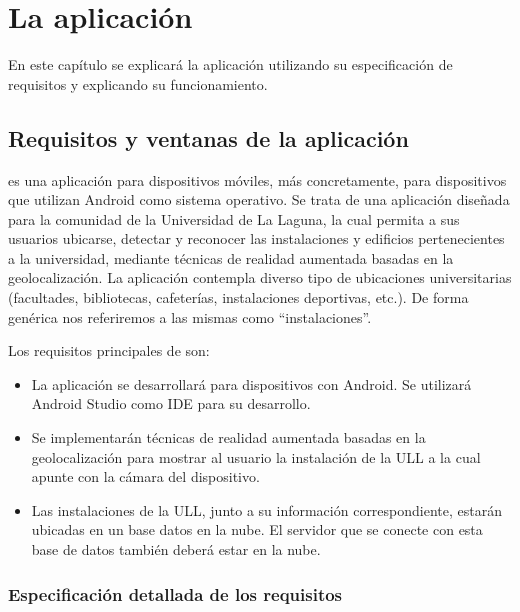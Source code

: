 
%
%
%

\chapter{La aplicación \ULLAR{}} \label{chap:LaAplicacion} 

En este capítulo se explicará la aplicación \ULLAR{} utilizando su especificación de requisitos y explicando su funcionamiento.

\section{Requisitos y ventanas de la aplicación} %

\ULLAR{} es una aplicación para dispositivos móviles, más concretamente, para dispositivos que utilizan Android como sistema operativo. Se trata de una aplicación diseñada para la comunidad de la Universidad de La Laguna, la cual permita a sus usuarios ubicarse, detectar y reconocer las instalaciones y edificios pertenecientes a la universidad, mediante técnicas de realidad aumentada basadas en la geolocalización.
La aplicación contempla diverso tipo de ubicaciones universitarias (facultades, bibliotecas, cafeterías, instalaciones deportivas, etc.). De forma genérica nos referiremos a las mismas como ``instalaciones''.

Los requisitos principales de \ULLAR{} son:
\begin{itemize}
    \item La aplicación se desarrollará para dispositivos con Android. Se utilizará Android Studio como IDE para su desarrollo.
    \item Se implementarán técnicas de realidad aumentada basadas en la geolocalización para mostrar al usuario la instalación de la ULL a la cual apunte con la cámara del dispositivo.
    \item Las instalaciones de la ULL, junto a su información correspondiente, estarán ubicadas en un base datos en la nube. El servidor que se conecte con esta base de datos también deberá estar en la nube.
\end{itemize}

\subsection{Especificación detallada de los requisitos} 

